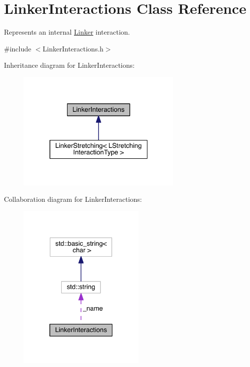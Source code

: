\hypertarget{classLinkerInteractions}{\section{Linker\+Interactions Class Reference}
\label{classLinkerInteractions}
}


Represents an internal \hyperlink{classLinker}{Linker} interaction.  




{\ttfamily \#include $<$Linker\+Interactions.\+h$>$}



Inheritance diagram for Linker\+Interactions\+:\nopagebreak
\begin{figure}[H]
\begin{center}
\leavevmode
\includegraphics[width=227pt]{classLinkerInteractions__inherit__graph}
\end{center}
\end{figure}


Collaboration diagram for Linker\+Interactions\+:\nopagebreak
\begin{figure}[H]
\begin{center}
\leavevmode
\includegraphics[width=175pt]{classLinkerInteractions__coll__graph}
\end{center}
\end{figure}
